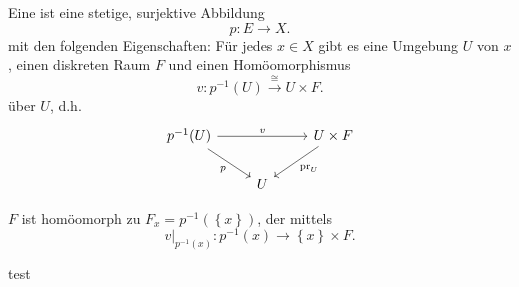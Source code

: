 \begin{definition}[Überlagerung]\label{def:überlagerung}
    Eine  ist eine stetige, surjektive Abbildung
    \[
    p\colon  E \to  X
    .\] 
    mit den folgenden Eigenschaften:
    Für jedes $x\in X$ gibt es eine Umgebung $U$ von  $x$, einen diskreten Raum  $F$ und einen Homöomorphismus
     \[
         v\colon  p^{-1}(U) \stackrel{\cong}{\longrightarrow} U \times F
    .\] 
    über $U$, d.h.
    \[
\begin{tikzcd}
    p^{-1}(U) \ar{rr}{v} \ar[swap]{dr}{p}& &  U \times F \ar{dl}{\pr_U} \\
                          & U
\end{tikzcd}
\]
\end{definition}

\begin{remark}
    $F$ ist homöomorph zu  $F_x = p^{-1}(\left \{x\right\} )$, der  mittels
    \[
        v|_{p^{-1}(x)} \colon  p^{-1}(x) \to  \left \{x\right\} \times F
    .\] 
\end{remark}
test
